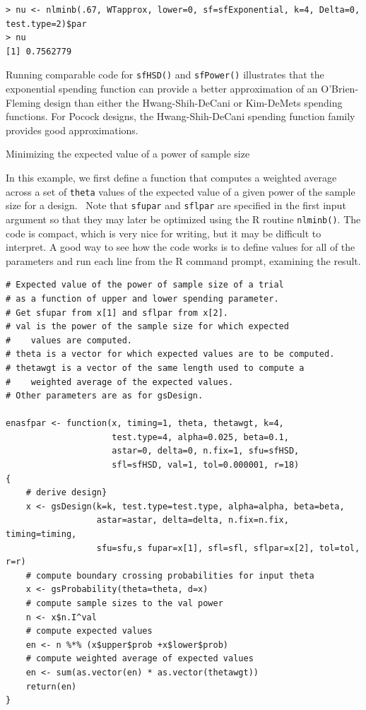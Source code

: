 \bigskip

\begin{verbatim}
> nu <- nlminb(.67, WTapprox, lower=0, sf=sfExponential, k=4, Delta=0, test.type=2)$par
> nu
[1] 0.7562779
\end{verbatim}
\bigskip

Running comparable code for \texttt{sfHSD()} and \texttt{sfPower()}
illustrates that the exponential spending function can provide a better
approximation of an O'Brien-Fleming design than either the Hwang-Shih-DeCani
or Kim-DeMets spending functions. For Pocock designs, the Hwang-Shih-DeCani
spending function family provides good approximations.

\begin{example}
\bigskip Minimizing the expected value of a power of sample size
\end{example}

In this example, we first define a function that computes a weighted average
across a set of \texttt{theta} values of the expected value of a given power
of the sample size for a design. \ Note that \texttt{sfupar} and
\texttt{sflpar} are specified in the first input argument so that they may later
be optimized using the R routine \texttt{nlminb()}. The code is compact, which
is very nice for writing, but it may be difficult to interpret. A good way to
see how the code works is to define values for all of the parameters and run
each line from the R command prompt, examining the result.

\bigskip

\begin{verbatim}
# Expected value of the power of sample size of a trial 
# as a function of upper and lower spending parameter. 
# Get sfupar from x[1] and sflpar from x[2].
# val is the power of the sample size for which expected
#    values are computed.
# theta is a vector for which expected values are to be computed.
# thetawgt is a vector of the same length used to compute a
#    weighted average of the expected values.
# Other parameters are as for gsDesign.

enasfpar <- function(x, timing=1, theta, thetawgt, k=4, 
                     test.type=4, alpha=0.025, beta=0.1, 
                     astar=0, delta=0, n.fix=1, sfu=sfHSD, 
                     sfl=sfHSD, val=1, tol=0.000001, r=18)
{
    # derive design}
    x <- gsDesign(k=k, test.type=test.type, alpha=alpha, beta=beta,
                  astar=astar, delta=delta, n.fix=n.fix, timing=timing,
                  sfu=sfu,s fupar=x[1], sfl=sfl, sflpar=x[2], tol=tol, r=r)
    # compute boundary crossing probabilities for input theta
    x <- gsProbability(theta=theta, d=x)
    # compute sample sizes to the val power
    n <- x$n.I^val
    # compute expected values
    en <- n %*% (x$upper$prob +x$lower$prob)
    # compute weighted average of expected values
    en <- sum(as.vector(en) * as.vector(thetawgt))
    return(en)
}
\end{verbatim}
\bigskip


